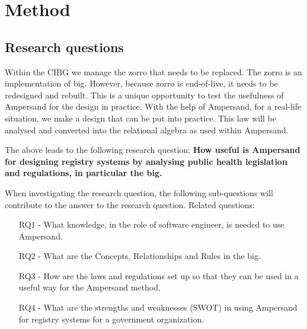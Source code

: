 \newpage
\section{Method} \label{Method}

\subsection{Research questions} \label{research_questions}

\begin{comment}
Onderzoeksvraag:
Hoe bruikbaar is Ampersand voor het ontwerpen van register-systemen door middel van het analyseren van wet- en regelgeving in de volksgezondheid en in het bijzonder de Wet-BIG
\end{comment}
Within the CIBG we manage the \acrshort{zorro} that needs to be replaced.
The \acrshort{zorro} is an implementation of \acrshort{big}.
However, because \acrshort{zorro} is end-of-live, it needs to be redesigned and rebuilt.
This is a unique opportunity to test the usefulness of Ampersand for the design in practice.
With the help of Ampersand, for a real-life situation, we make a design that can be put into practice.
This law will be analysed and converted into the relational algebra as used within Ampersand.

The above leads to the following research question:
\newline
\textbf{How useful is Ampersand for designing registry systems by analysing public health legislation and regulations, in particular the \acrshort{big}.}

When investigating the research question, the following sub-questions will contribute to the answer to the research question.
\newline Related questions:
\begin{enumerate}
\item[RQ1]- What knowledge, in the role of software engineer, is needed to use Ampersand.
\item[RQ2]- What are the Concepts, Relationships and Rules in the \acrshort{big}.
\item[RQ3]- How are the laws and regulations set up so that they can be used in a useful way for the Ampersand method.
\item[RQ4]- What are the strengths and weaknesses (SWOT) in using Ampersand for registry systems for a government organization.
\end{enumerate}


